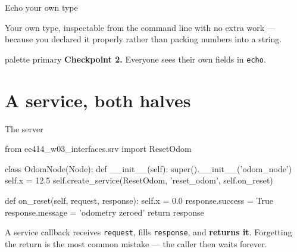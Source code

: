 \documentclass[aspectratio=169]{beamer}
\begin{document}
\begin{frame}[fragile]{Echo your own type}

  \vspace{0.4em}
  \small
  Your own type, inspectable from the command line with no extra work --- because you declared
  it properly rather than packing numbers into a string.

  \vspace{0.2em}
  \centering
  \begin{beamercolorbox}[sep=5pt,center,rounded=true]{palette primary}
    \footnotesize \textbf{Checkpoint 2.} Everyone sees their own fields in \texttt{echo}.
  \end{beamercolorbox}
\end{frame}

\section{A service, both halves}

\begin{frame}[fragile]{The server}
  \begin{pycodes}
from ee414_w03_interfaces.srv import ResetOdom

class OdomNode(Node):
    def __init__(self):
        super().__init__('odom_node')
        self.x = 12.5
        self.create_service(ResetOdom, 'reset_odom', self.on_reset)

    def on_reset(self, request, response):
        self.x = 0.0
        response.success = True
        response.message = 'odometry zeroed'
        return response
  \end{pycodes}

  \vspace{0.2em}
  \footnotesize
  A service callback receives \texttt{request}, fills \texttt{response}, and \textbf{returns
  it}. Forgetting the return is the most common mistake --- the caller then waits forever.
\end{frame}
\end{document}
